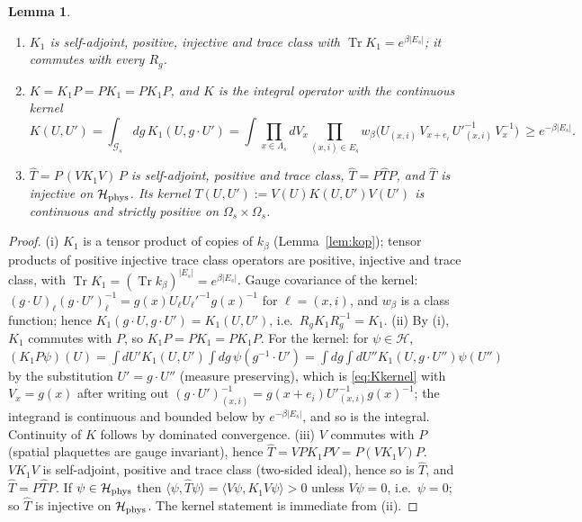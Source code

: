 \documentclass[11pt,a4paper]{article}
\newtheorem{lemma}[theorem]{Lemma}
\theoremstyle{definition}
\theoremstyle{remark}
\DeclareMathOperator{\Tr}{Tr}
\newcommand{\cH}{\mathcal{H}}
\newcommand{\cG}{\mathcal{G}}
\newcommand{\hT}{\hat{T}}
\newcommand{\ip}[2]{\langle #1,#2\rangle}
\begin{document}
\begin{lemma}\label{lem:K}
\begin{enumerate}[label=(\roman*)]
\item $K_1$ is self-adjoint, positive, injective and trace class with $\Tr K_1=e^{\beta|E_s|}$; it commutes with every $R_g$.
\item $K=K_1P=PK_1=PK_1P$, and $K$ is the integral operator with the continuous kernel
\begin{equation}\label{eq:Kkernel}
K(U,U')=\int_{\cG_s}dg\,K_1(U,g\cdot U')=\int\prod_{x\in\Lambda_s}dV_x\prod_{(x,i)\in E_s}
w_\beta\bigl(U_{(x,i)}\,V_{x+e_i}\,U'^{-1}_{(x,i)}\,V_x^{-1}\bigr)\ \ge e^{-\beta|E_s|}.
\end{equation}
\item $\hT=P\,(VK_1V)\,P$ is self-adjoint, positive and trace class, $\hT=P\hT P$, and $\hT$ is injective on
$\cH_{\rm phys}$. Its kernel $T(U,U'):=V(U)K(U,U')V(U')$ is continuous and strictly positive on $\Omega_s\times\Omega_s$.
\end{enumerate}
\end{lemma}

\begin{proof}
(i) $K_1$ is a tensor product of copies of $k_\beta$ (Lemma~\ref{lem:kop}); tensor products of positive injective
trace class operators are positive, injective and trace class, with $\Tr K_1=(\Tr k_\beta)^{|E_s|}=e^{\beta|E_s|}$.
Gauge covariance of the kernel: $(g\cdot U)_\ell(g\cdot U')_\ell^{-1}=g(x)U_\ell U_\ell'^{-1}g(x)^{-1}$ for
$\ell=(x,i)$, and $w_\beta$ is a class function; hence $K_1(g\cdot U,g\cdot U')=K_1(U,U')$, i.e.\ $R_gK_1R_g^{-1}=K_1$.
(ii) By (i), $K_1$ commutes with $P$, so $K_1P=PK_1=PK_1P$. For the kernel: for $\psi\in\cH$,
$(K_1P\psi)(U)=\int dU'K_1(U,U')\int dg\,\psi(g^{-1}\cdot U')=\int dg\int dU''K_1(U,g\cdot U'')\psi(U'')$ by the
substitution $U'=g\cdot U''$ (measure preserving), which is \eqref{eq:Kkernel} with $V_x=g(x)$ after writing out
$(g\cdot U')^{-1}_{(x,i)}=g(x+e_i)U'^{-1}_{(x,i)}g(x)^{-1}$; the integrand is continuous and bounded below by $e^{-\beta|E_s|}$,
and so is the integral. Continuity of $K$ follows by dominated convergence.
(iii) $V$ commutes with $P$ (spatial plaquettes are gauge invariant), hence $\hT=VPK_1PV=P(VK_1V)P$. $VK_1V$ is
self-adjoint, positive and trace class (two-sided ideal), hence so is $\hT$, and $\hT=P\hT P$. If $\psi\in\cH_{\rm phys}$
then $\ip\psi{\hT\psi}=\ip{V\psi}{K_1V\psi}>0$ unless $V\psi=0$, i.e.\ $\psi=0$; so $\hT$ is injective on
$\cH_{\rm phys}$. The kernel statement is immediate from (ii).
\end{proof}
\end{document}
